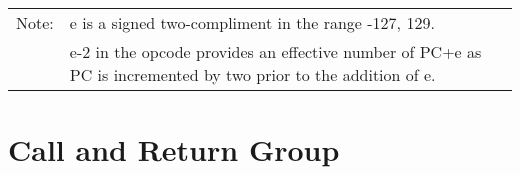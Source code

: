 \documentclass[oneside,a4paper]{book}
\begin{document}
{\begin{tabular}{llcccccccccccccccl}
		\hline

		Note:
			& \multicolumn{17}{l}{\parbox{12cm}{e is a signed two-compliment in the range -127, 129.}}\notet\noteb \\

			& \multicolumn{17}{l}{\parbox{12cm}{e-2 in the opcode provides an effective number of PC+e as PC is incremented by two prior to the addition of e.}}\noteb \\[5pt]
			
		\hline

	\end{tabular}
}


\section{Call and Return Group}
\end{document}
